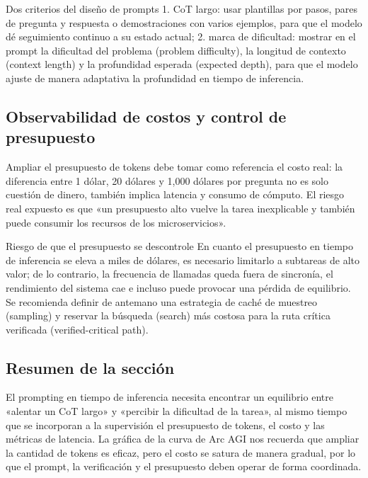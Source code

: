 \begin{knowledgebox}{Dos criterios del diseño de prompts}
1. CoT largo: usar plantillas por pasos, pares de pregunta y respuesta o demostraciones con varios ejemplos, para que el modelo dé seguimiento continuo a su estado actual; 2. marca de dificultad: mostrar en el prompt la dificultad del problema (problem difficulty), la longitud de contexto (context length) y la profundidad esperada (expected depth), para que el modelo ajuste de manera adaptativa la profundidad en tiempo de inferencia.
\end{knowledgebox}

\subsection{Observabilidad de costos y control de presupuesto}
Ampliar el presupuesto de tokens debe tomar como referencia el costo real: la diferencia entre 1 dólar, 20 dólares y 1,000 dólares por pregunta no es solo cuestión de dinero, también implica latencia y consumo de cómputo. El riesgo real expuesto es que «un presupuesto alto vuelve la tarea inexplicable y también puede consumir los recursos de los microservicios».

\begin{warningbox}{Riesgo de que el presupuesto se descontrole}
En cuanto el presupuesto en tiempo de inferencia se eleva a miles de dólares, es necesario limitarlo a subtareas de alto valor; de lo contrario, la frecuencia de llamadas queda fuera de sincronía, el rendimiento del sistema cae e incluso puede provocar una pérdida de equilibrio. Se recomienda definir de antemano una estrategia de caché de muestreo (sampling) y reservar la búsqueda (search) más costosa para la ruta crítica verificada (verified-critical path).
\end{warningbox}

\subsection{Resumen de la sección}
El prompting en tiempo de inferencia necesita encontrar un equilibrio entre «alentar un CoT largo» y «percibir la dificultad de la tarea», al mismo tiempo que se incorporan a la supervisión el presupuesto de tokens, el costo y las métricas de latencia. La gráfica de la curva de Arc AGI nos recuerda que ampliar la cantidad de tokens es eficaz, pero el costo se satura de manera gradual, por lo que el prompt, la verificación y el presupuesto deben operar de forma coordinada.

